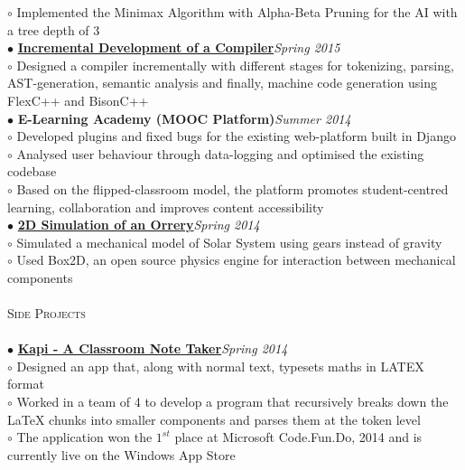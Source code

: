 \documentclass[a4paper,9pt]{article}
\begin{document}
\hspace*{0.35cm}$\circ$ Implemented the Minimax Algorithm with Alpha-Beta Pruning for the AI with a tree depth of 3\\
\textbf{$\bullet$} \href{https://github.com/ranveeraggarwal/compiler}{\textbf{Incremental Development of a Compiler}}\hfill \textit{Spring 2015}\\
\hspace*{0.35cm}$\circ$ Designed a compiler incrementally with different stages for tokenizing, parsing, AST-generation, semantic analysis and finally, machine code generation using FlexC++ and BisonC++\\
\textbf{$\bullet$} \textbf{E-Learning Academy (MOOC Platform)}\hfill \textit{Summer 2014}\\
\hspace*{0.35cm}$\circ$ Developed plugins and fixed bugs for the existing web-platform built in Django\\
\hspace*{0.35cm}$\circ$ Analysed user behaviour through data-logging and optimised the existing codebase\\
\hspace*{0.35cm}$\circ$ Based on the flipped-classroom model, the platform promotes student-centred learning, collaboration and improves content accessibility\\
\textbf{$\bullet$} \href{https://github.com/ranveeraggarwal/orrery-simulation-box2d}{\textbf{2D Simulation of an Orrery}}\hfill \textit{Spring 2014}\\
\hspace*{0.35cm}$\circ$ Simulated a mechanical model of Solar System using gears instead of gravity\\
\hspace*{0.35cm}$\circ$ Used Box2D, an open source physics engine for interaction between mechanical components\\\\

\textcolor{myrust}{\large{\textsc{Side Projects}}}\textcolor{mygray}{\sout{\hfill}}\\\\
\textbf{$\bullet$} \href{https://github.com/manishearth/kapi}{\textbf{Kapi - A Classroom Note Taker}}\hfill \textit{Spring 2014}\\
\hspace*{0.35cm}$\circ$ Designed an app that, along with normal text, typesets maths in LATEX format\\
\hspace*{0.35cm}$\circ$ Worked in a team of 4 to develop a program that recursively breaks down the \LaTeX{} chunks into smaller components and parses them at the token level\\
\hspace*{0.35cm}$\circ$ The application won the $1^{st}$ place at Microsoft Code.Fun.Do, 2014 and is currently live on the Windows App Store\\\\
\end{document}
